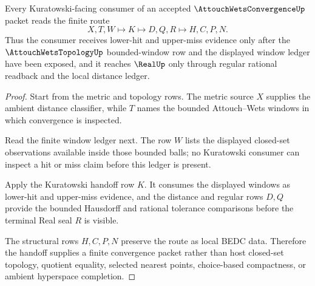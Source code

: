 \begin{theorem}
\label{thm:attouch-wets-convergence-kuratowski-handoff}
Every Kuratowski-facing consumer of an accepted $\AttouchWetsConvergenceUp$ packet reads the finite route
$$
X,T,W\longmapsto K\longmapsto D,Q,R\longmapsto H,C,P,N .
$$
Thus the consumer receives lower-hit and upper-miss evidence only after the $\AttouchWetsTopologyUp$ bounded-window row and the displayed window ledger have been exposed, and it reaches $\RealUp$ only through regular rational readback and the local distance ledger.
\end{theorem}
\begin{proof}
Start from the metric and topology rows. The metric source $X$ supplies the ambient distance classifier, while $T$ names the bounded Attouch--Wets windows in which convergence is inspected.

Read the finite window ledger next. The row $W$ lists the displayed closed-set observations available inside those bounded balls; no Kuratowski consumer can inspect a hit or miss claim before this ledger is present.

Apply the Kuratowski handoff row $K$. It consumes the displayed windows as lower-hit and upper-miss evidence, and the distance and regular rows $D,Q$ provide the bounded Hausdorff and rational tolerance comparisons before the terminal Real seal $R$ is visible.

The structural rows $H,C,P,N$ preserve the route as local BEDC data. Therefore the handoff supplies a finite convergence packet rather than host closed-set topology, quotient equality, selected nearest points, choice-based compactness, or ambient hyperspace completion.
\end{proof}



